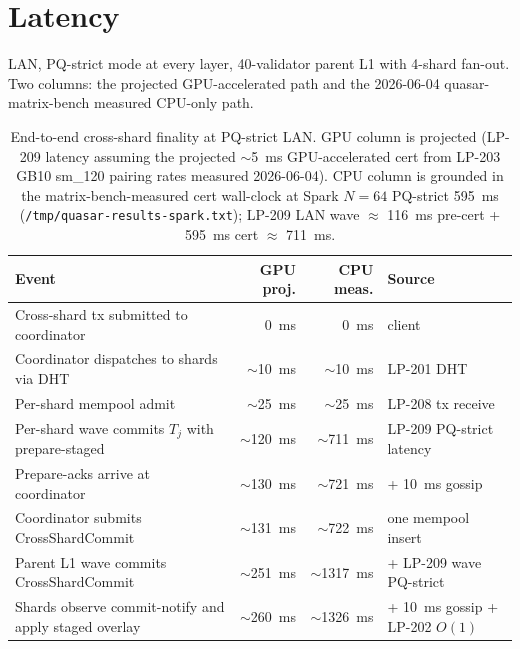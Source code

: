 \section{Latency}

LAN, PQ-strict mode at every layer, 40-validator parent L1 with
4-shard fan-out. Two columns: the projected GPU-accelerated path
and the 2026-06-04 quasar-matrix-bench measured CPU-only path.

\begin{table}[h]
\centering
\small
\begin{tabular}{@{}p{5.5cm}rrp{3.6cm}@{}}
\toprule
\textbf{Event} & \textbf{GPU proj.} & \textbf{CPU meas.} & \textbf{Source} \\
\midrule
Cross-shard tx submitted to coordinator & \SI{0}{\milli\second} & \SI{0}{\milli\second} & client \\
Coordinator dispatches to shards via DHT & $\sim$\SI{10}{\milli\second} & $\sim$\SI{10}{\milli\second} & LP-201 DHT \\
Per-shard mempool admit & $\sim$\SI{25}{\milli\second} & $\sim$\SI{25}{\milli\second} & LP-208 tx receive \\
Per-shard wave commits $T_j$ with prepare-staged & $\sim$\SI{120}{\milli\second} & $\sim$\SI{711}{\milli\second} & LP-209 PQ-strict latency \\
Prepare-acks arrive at coordinator & $\sim$\SI{130}{\milli\second} & $\sim$\SI{721}{\milli\second} & + \SI{10}{\milli\second} gossip \\
Coordinator submits CrossShardCommit & $\sim$\SI{131}{\milli\second} & $\sim$\SI{722}{\milli\second} & one mempool insert \\
Parent L1 wave commits CrossShardCommit & $\sim$\SI{251}{\milli\second} & $\sim$\SI{1317}{\milli\second} & + LP-209 wave PQ-strict \\
Shards observe commit-notify and apply staged overlay & $\sim$\SI{260}{\milli\second} & $\sim$\SI{1326}{\milli\second} & + \SI{10}{\milli\second} gossip + LP-202 $O(1)$ \\
\bottomrule
\end{tabular}
\caption{End-to-end cross-shard finality at PQ-strict LAN. GPU
column is projected (LP-209 latency assuming the projected
$\sim$\SI{5}{\milli\second} GPU-accelerated cert from LP-203 GB10
sm\_120 pairing rates measured 2026-06-04). CPU column is
grounded in the matrix-bench-measured cert wall-clock at
Spark $N{=}64$ PQ-strict \SI{595}{\milli\second}
(\texttt{/tmp/quasar-results-spark.txt}); LP-209 LAN wave
$\approx$ \SI{116}{\milli\second} pre-cert + \SI{595}{\milli\second}
cert $\approx$ \SI{711}{\milli\second}.}
\label{tab:latency-lan}
\end{table}

